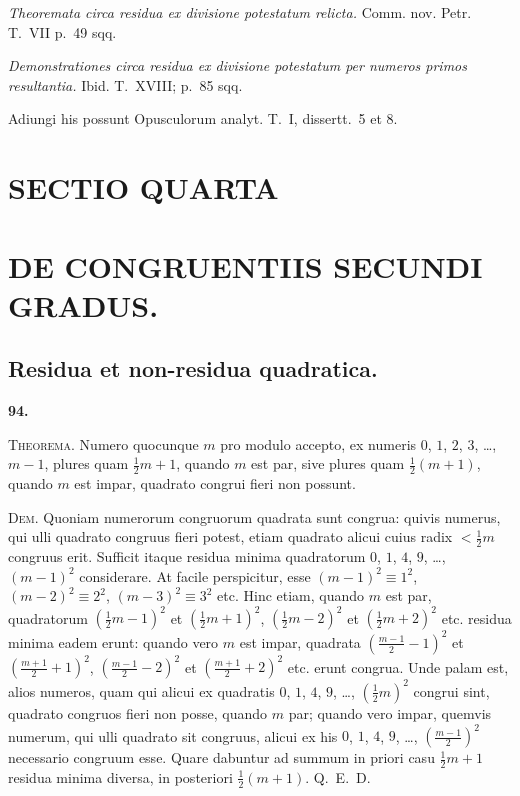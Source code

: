 \documentclass[12pt,a4paper]{article}
\theoremstyle{plain}
\theoremstyle{definition}
\theoremstyle{remark}
\begin{document}
\textit{Theoremata circa residua ex divisione potestatum relicta.} Comm. nov. Petr. T.~VII p.~49 sqq.

\textit{Demonstrationes circa residua ex divisione potestatum per numeros primos resultantia.} Ibid. T.~XVIII; p.~85 sqq.

Adiungi his possunt Opusculorum analyt. T.~I, dissertt.~5 et 8.


\section*{SECTIO QUARTA}
\section*{DE CONGRUENTIIS SECUNDI GRADUS.}

\subsection*{Residua et non-residua quadratica.}

\setcounter{satz}{94}
\addtocounter{satz}{-1}
\textbf{94.}

\textsc{Theorema.} Numero quocunque $m$ pro modulo accepto, ex numeris $0$, $1$, $2$, $3$, \ldots, $m-1$, plures quam $\frac{1}{2}m+1$, quando $m$ est par, sive plures quam $\frac{1}{2}(m+1)$, quando $m$ est impar, quadrato congrui fieri non possunt.

\textsc{Dem.} Quoniam numerorum congruorum quadrata sunt congrua: quivis numerus, qui ulli quadrato congruus fieri potest, etiam quadrato alicui cuius radix $<\frac{1}{2}m$ congruus erit. Sufficit itaque residua minima quadratorum $0$, $1$, $4$, $9$, \ldots, $(m-1)^2$ considerare. At facile perspicitur, esse $(m-1)^2 \equiv 1^2$, $(m-2)^2 \equiv 2^2$, $(m-3)^2 \equiv 3^2$ etc. Hinc etiam, quando $m$ est par, quadratorum $(\frac{1}{2}m-1)^2$ et $(\frac{1}{2}m+1)^2$, $(\frac{1}{2}m-2)^2$ et $(\frac{1}{2}m+2)^2$ etc. residua minima eadem erunt: quando vero $m$ est impar, quadrata $(\frac{m-1}{2}-1)^2$ et $(\frac{m+1}{2}+1)^2$, $(\frac{m-1}{2}-2)^2$ et $(\frac{m+1}{2}+2)^2$ etc. erunt congrua. Unde palam est, alios numeros, quam qui alicui ex quadratis $0$, $1$, $4$, $9$, \ldots, $(\frac{1}{2}m)^2$ congrui sint, quadrato congruos fieri non posse, quando $m$ par; quando vero impar, quemvis numerum, qui ulli quadrato sit congruus, alicui ex his $0$, $1$, $4$, $9$, \ldots, $(\frac{m-1}{2})^2$ necessario congruum esse. Quare dabuntur ad summum in priori casu $\frac{1}{2}m+1$ residua minima diversa, in posteriori $\frac{1}{2}(m+1)$. Q.~E.~D.
\end{document}
